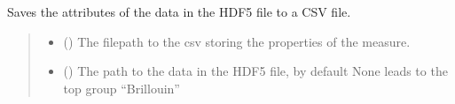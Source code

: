 \documentclass[letterpaper,10pt,english]{sphinxmanual}
\begin{document}
\begin{fulllineitems}
\begin{fulllineitems}
\begin{quote}
\begin{description}
\begin{itemize}
\end{itemize}

\end{description}\end{quote}

\end{fulllineitems}


\begin{fulllineitems}
\label{\detokenize{source/HDF5_BLS:HDF5_BLS.wrapper.Wrapper.save_properties_csv}}
\pysigstartsignatures
\pysiglinewithargsret
{}
{\sphinxparamcomma {}}
{}
\pysigstopsignatures
\sphinxAtStartPar
Saves the attributes of the data in the HDF5 file to a CSV file.
\begin{quote}\begin{description}
\begin{itemize}
\item {} 
\sphinxAtStartPar
{} () \textendash{} The filepath to the csv storing the properties of the measure.

\item {} 
\sphinxAtStartPar
{} (\sphinxstyleliteralemphasis{\sphinxupquote{, }}) \textendash{} The path to the data in the HDF5 file, by default None leads to the top group “Brillouin”

\end{itemize}

\end{description}\end{quote}

\end{fulllineitems}



\end{fulllineitems}
\end{document}

